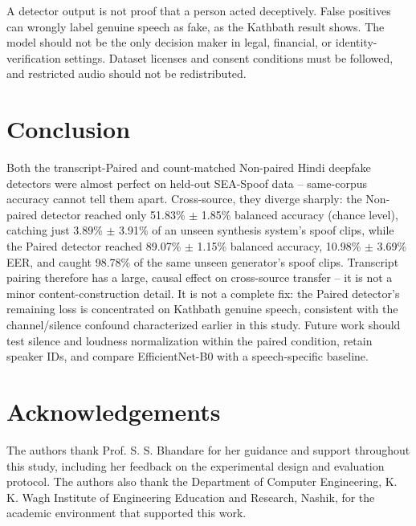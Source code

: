 \documentclass[3p,times,procedia]{elsarticle}
\begin{document}
A detector output is not proof that a person acted deceptively. False
positives can wrongly label genuine speech as fake, as the Kathbath result
shows. The model should not be the only decision maker in legal, financial,
or identity-verification settings. Dataset licenses and consent conditions
must be followed, and restricted audio should not be redistributed.

\section{Conclusion}
Both the transcript-Paired and count-matched Non-paired Hindi deepfake
detectors were almost perfect on held-out SEA-Spoof data -- same-corpus
accuracy cannot tell them apart. Cross-source, they diverge sharply: the
Non-paired detector reached only 51.83\% $\pm$ 1.85\% balanced accuracy
(chance level), catching just 3.89\% $\pm$ 3.91\% of an unseen synthesis
system's spoof clips, while the Paired detector reached 89.07\% $\pm$
1.15\% balanced accuracy, 10.98\% $\pm$ 3.69\% EER, and caught 98.78\% of
the same unseen generator's spoof clips. Transcript pairing therefore has a
large, causal effect on cross-source transfer -- it is not a minor
content-construction detail. It is not a complete fix: the Paired
detector's remaining loss is concentrated on Kathbath genuine speech,
consistent with the channel/silence confound characterized earlier in this
study. Future work should test silence and loudness normalization within
the paired condition, retain speaker IDs, and compare EfficientNet-B0 with
a speech-specific baseline.

\section*{Acknowledgements}
The authors thank Prof. S. S. Bhandare for her guidance and support throughout this study, including her feedback on the experimental design and evaluation protocol. The authors also thank the Department of Computer Engineering, K. K. Wagh Institute of Engineering Education and Research, Nashik, for the academic environment that supported this work.



\end{document}

